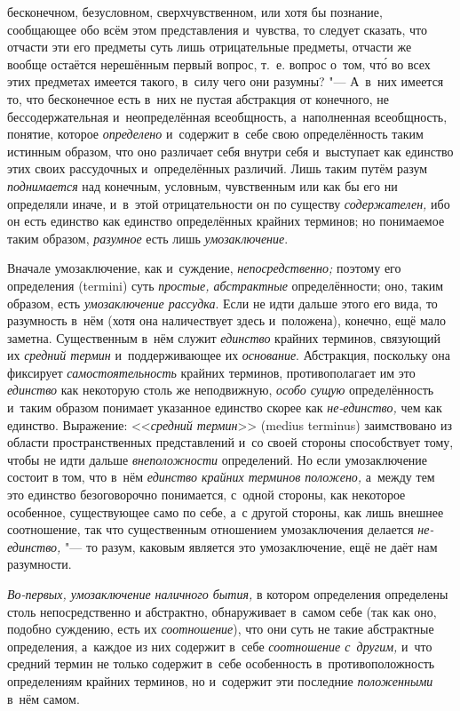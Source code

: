 бесконечном, безусловном, сверхчувственном, или хотя бы познание,
сообщающее обо всём этом представления и~чувства, то следует сказать, что
отчасти эти его предметы суть лишь отрицательные предметы, отчасти же
вообще остаётся нерешённым первый вопрос, т.~е. вопрос о~том, чт\'{о} во всех
этих предметах имеется такого, в~силу чего они разумны? "--- А~в~них имеется
то, что бесконечное есть в~них не пустая абстракция от конечного, не
бессодержательная и~неопределённая всеобщность, а~наполненная всеобщность,
понятие, которое {\em определено} и~содержит в~себе свою определённость таким
истинным образом, что оно различает себя внутри себя и~выступает как единство
этих своих рассудочных и~определённых различий. Лишь таким путём разум
{\em поднимается} над конечным, условным, чувственным или как бы его ни
определяли иначе, и~в~этой отрицательности он по существу {\em содержателен,}
ибо он есть единство как единство определённых крайних терминов; но понимаемое
таким образом, {\em разумное} есть лишь {\em умозаключение}.

Вначале умозаключение, как и~суждение, {\em непосредственно;} поэтому его
определения (termini) суть {\em простые, абстрактные} определённости;
оно, таким образом, есть {\em умозаключение рассудка}. Если не идти дальше
этого его вида, то разумность в~нём (хотя она наличествует здесь и~положена),
конечно, ещё мало заметна. Существенным в~нём служит {\em единство} крайних
терминов, связующий их {\em средний термин} и~поддерживающее их
{\em основание}. Абстракция, поскольку она фиксирует {\em самостоятельность}
крайних терминов, противополагает им это {\em единство} как некоторую столь же
неподвижную, {\em особо сущую} определённость и~таким образом понимает
указанное единство скорее как {\em не-единство,} чем как единство. Выражение:
<<{\em средний термин}>> (medius terminus) заимствовано из области
пространственных представлений и~со своей стороны способствует тому, чтобы не
идти дальше {\em внеположности} определений. Но если умозаключение состоит в
том, что в~нём {\em единство крайних терминов положено,} а~между тем это
единство безоговорочно понимается, с~одной стороны, как некоторое особенное,
существующее само по себе, а~с другой стороны, как лишь внешнее соотношение,
так что существенным отношением умозаключения делается {\em не-единство,} "---
то разум, каковым является это умозаключение, ещё не даёт нам разумности.

{\em Во-первых, умозаключение наличного бытия,}
в котором определения определены столь непосредственно и
абстрактно, обнаруживает в~самом себе (так как оно, подобно суждению, есть
их {\em соотношение}), что они суть не такие абстрактные определения, а~каждое
из них содержит в~себе {\em соотношение с~другим,} и~что средний термин не
только содержит в~себе особенность в~противоположность определениям крайних
терминов, но и~содержит эти последние {\em положенными} в~нём самом.

